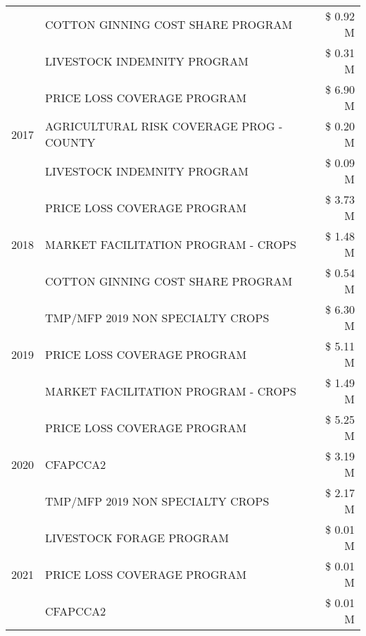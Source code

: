 \begin{tabular}{llr}
 & COTTON GINNING COST SHARE PROGRAM & \$ 0.92 M \\
 & LIVESTOCK INDEMNITY PROGRAM & \$ 0.31 M \\
\cline{1-3}
\multirow[t]{3}{*}{2017} & PRICE LOSS COVERAGE PROGRAM & \$ 6.90 M \\
 & AGRICULTURAL RISK COVERAGE PROG - COUNTY & \$ 0.20 M \\
 & LIVESTOCK INDEMNITY PROGRAM & \$ 0.09 M \\
\cline{1-3}
\multirow[t]{3}{*}{2018} & PRICE LOSS COVERAGE PROGRAM & \$ 3.73 M \\
 & MARKET FACILITATION PROGRAM - CROPS & \$ 1.48 M \\
 & COTTON GINNING COST SHARE PROGRAM & \$ 0.54 M \\
\cline{1-3}
\multirow[t]{3}{*}{2019} & TMP/MFP 2019 NON SPECIALTY CROPS & \$ 6.30 M \\
 & PRICE LOSS COVERAGE PROGRAM & \$ 5.11 M \\
 & MARKET FACILITATION PROGRAM - CROPS & \$ 1.49 M \\
\cline{1-3}
\multirow[t]{3}{*}{2020} & PRICE LOSS COVERAGE PROGRAM & \$ 5.25 M \\
 & CFAPCCA2 & \$ 3.19 M \\
 & TMP/MFP 2019 NON SPECIALTY CROPS & \$ 2.17 M \\
\cline{1-3}
\multirow[t]{3}{*}{2021} & LIVESTOCK FORAGE PROGRAM & \$ 0.01 M \\
 & PRICE LOSS COVERAGE PROGRAM & \$ 0.01 M \\
 & CFAPCCA2 & \$ 0.01 M \\
\cline{1-3}
\bottomrule
\end{tabular}
